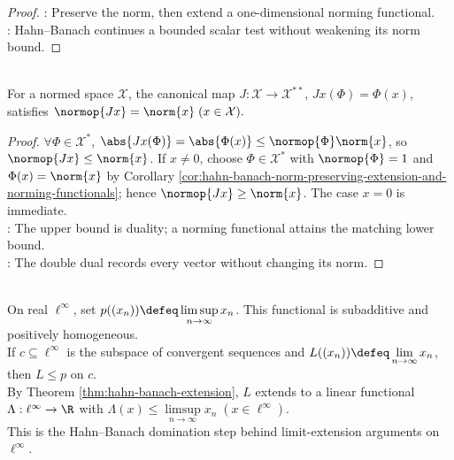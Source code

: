 \begin{corollary}
\begin{proof}
: Preserve the norm, then extend a one-dimensional norming functional.\\
: Hahn--Banach continues a bounded scalar test without weakening its norm bound.
\end{proof}
\end{corollary}

\begin{corollary} \label{cor:natural-embedding-isometry} \\
For a normed space $\mathcal{X}$, the canonical map $J:\mathcal{X}\to\mathcal{X}^{**}$, $Jx(\Phi)=\Phi(x)$, satisfies
$\normop{Jx}=\norm{x}\;(x\in\mathcal{X}).$
\begin{proof}
$\forall\Phi\in\mathcal{X}^*$, $\abs{Jx(\Phi)}=\abs{\Phi(x)}\leq\normop{\Phi}\norm{x}$, so $\normop{Jx}\leq\norm{x}$. If $x\neq0$, choose $\Phi\in\mathcal{X}^*$ with $\normop{\Phi}=1$ and $\Phi(x)=\norm{x}$ by Corollary \ref{cor:hahn-banach-norm-preserving-extension-and-norming-functionals}; hence $\normop{Jx}\geq\norm{x}$. The case $x=0$ is immediate.\\
: The upper bound is duality; a norming functional attains the matching lower bound.\\
: The double dual records every vector without changing its norm.
\end{proof}
\end{corollary}

\begin{example} \label{ex:banach-limit-hahn-banach} \\
On real $\ell^\infty$, set $p((x_n))\defeq\limsup\limits_{n\to\infty}x_n$. This functional is subadditive and positively homogeneous.\\
If $c\subseteq\ell^\infty$ is the subspace of convergent sequences and $L((x_n))\defeq\lim\limits_{n\to\infty}x_n$, then $L\leq p$ on $c$. \\
By Theorem \ref{thm:hahn-banach-extension}, $L$ extends to a linear functional $\Lambda:\ell^\infty\to\R$ with $\Lambda(x)\leq\limsup\limits_{n\to\infty}x_n\;(x\in\ell^\infty)$.\\
This is the Hahn--Banach domination step behind limit-extension arguments on $\ell^\infty$.
\end{example}


